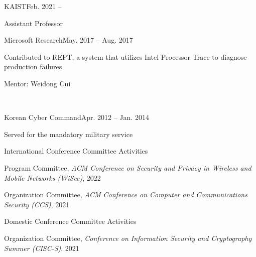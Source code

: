 \documentclass[11pt,letterpaper]{article}
\begin{document}
\begin{centry}{KAIST}{Feb. 2021 --}
\item Assistant Professor
\end{centry}
\begin{centry}{Microsoft Research}{May. 2017 -- Aug. 2017}
\item Contributed to REPT, a system that utilizes Intel Processor Trace to diagnose production failures
  \item Mentor:  Weidong Cui
\end{centry}
 \\
\begin{centry}{Korean Cyber Command}{Apr. 2012 -- Jan. 2014}
  \item Served for the mandatory military service
\end{centry}

\begin{centry}{International Conference Committee Activities}{}
  \item{Program Committee, \emph{ACM Conference on Security and Privacy in Wireless and Mobile Networks (WiSec)}, 2022}
  \item{Organization Committee, \emph{ACM Conference on Computer and Communications Security (CCS)}, 2021}
\end{centry}

\begin{centry}{Domestic Conference Committee Activities}{}
  \item{Organization Committee, \emph{Conference on Information Security and Cryptography Summer (CISC-S)}, 2021}
\end{centry}
\end{document}
